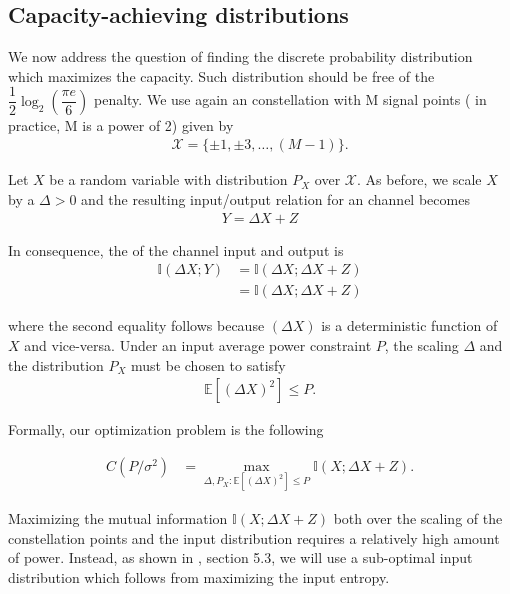 \subsection{Capacity-achieving distributions}
We now address the question of finding the discrete probability distribution which maximizes the capacity. Such distribution should be free of the $ \dfrac{1}{2} \log_{2} \left(\dfrac{\pi e}{6}\right)$ penalty. We use again an  constellation with M signal points ( in practice, M is a power of 2) given by 
\begin{align}
	\mathcal{X} = \{\pm 1, \pm 3,\dots, (M-1)\}.
\end{align}

Let $X$ be a random variable with distribution $P_X$ over $\mathcal{X}$. As before, we scale $X$ by a $\Delta > 0$ and the resulting input/output relation for an  channel becomes
\begin{align}
	Y = \Delta X + Z
\end{align}

In consequence, the  of the channel input and output is 
\begin{align}
	\mathbb{I}(\Delta X; Y) &= \mathbb{I}(\Delta X; \Delta X + Z)\\
	&= \mathbb{I}(\Delta X; \Delta X + Z)
\end{align}

where the second equality follows because $(\Delta X)$ is a deterministic function of $X$ and vice-versa. Under an input average power constraint $P$, the scaling $\Delta$ and the distribution $P_X$ must be chosen to satisfy
\begin{align}
	\mathbb{E}[(\Delta X)^2] \leq P.
\end{align}

Formally, our optimization problem is the following

\begin{align}
	C(P/\sigma^2) &= \max\limits_{\Delta, P_X :\mathbb{E}[(\Delta X)^2] \leq P} \mathbb{I}(X;\Delta X+Z).
\end{align}

Maximizing the mutual information $\mathbb{I}(X;\Delta X+Z)$ both over the scaling of the constellation points and the input distribution requires a relatively high amount of power. Instead, as shown in \cite{BoechererCM}, section 5.3, we will use a sub-optimal input distribution which follows from maximizing the input entropy.

